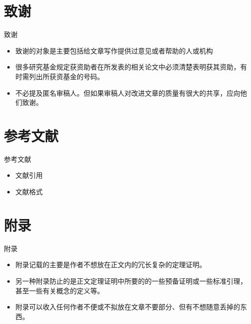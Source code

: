 \documentclass[13pt]{ctexbeamer}
\begin{document}
\section{致谢}
\begin{frame}{致谢}

	\begin{itemize}
		\item  致谢的对象是主要包括给文章写作提供过意见或者帮助的人或机构
		\item  很多研究基金规定获资助者在所发表的\alert{相关}论文中必须清楚表明获其资助，有时需列出所获资基金的号码。
		\item 不必提及匿名审稿人。但如果审稿人对改进文章的质量有很大的共享，应向他们致谢。
	\end{itemize}
\end{frame}

\section{参考文献}
\begin{frame}{参考文献}

	\begin{itemize}
		\item  文献引用
		\item  文献格式
	\end{itemize}
\end{frame}

\section{附录}
\begin{frame}{附录}

	\begin{itemize}
		\item  附录记载的主要是作者不想放在正文内的冗长复杂的定理证明。
		\item  另一种附录防止的是正文定理证明中所要的的一些预备证明或一些标准引理，甚至一些有关概念的定义等。
		\item 附录可以收入任何作者不便或不拟放在文章不要部分、但有不想随意丢掉的东西。
	\end{itemize}
\end{frame}
\end{document}
